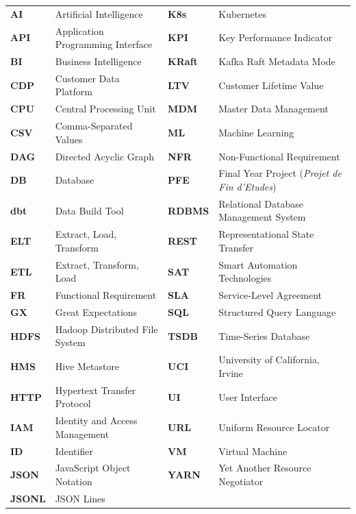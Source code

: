 \begingroup
{}
\normalsize
\singlespacing
\setlength{\tabcolsep}{3pt}
\renewcommand{\arraystretch}{1.04}
\noindent
\begin{tabularx}{\textwidth}{
    >{\bfseries\RaggedRight\arraybackslash}p{}
    >{\RaggedRight\arraybackslash}X
    !{\hspace{6pt}\color{ModernTableRule}\vrule width 0.6pt\hspace{6pt}}
    >{\bfseries\RaggedRight\arraybackslash}p{0.115\textwidth}
    >{\RaggedRight\arraybackslash}X
}
    AI & Artificial Intelligence & K8s & Kubernetes \\
    API & Application Programming Interface & KPI & Key Performance Indicator \\
    BI & Business Intelligence & KRaft & Kafka Raft Metadata Mode \\
    CDP & Customer Data Platform & LTV & Customer Lifetime Value \\
    CPU & Central Processing Unit & MDM & Master Data Management \\
    CSV & Comma-Separated Values & ML & Machine Learning \\
    DAG & Directed Acyclic Graph & NFR & Non-Functional Requirement \\
    DB & Database & PFE & Final Year Project (\textit{Projet de Fin d'Etudes}) \\
    dbt & Data Build Tool & RDBMS & Relational Database Management System \\
    ELT & Extract, Load, Transform & REST & Representational State Transfer \\
    ETL & Extract, Transform, Load & SAT & Smart Automation Technologies \\
    FR & Functional Requirement & SLA & Service-Level Agreement \\
    GX & Great Expectations & SQL & Structured Query Language \\
    HDFS & Hadoop Distributed File System & TSDB & Time-Series Database \\
    HMS & Hive Metastore & UCI & University of California, Irvine \\
    HTTP & Hypertext Transfer Protocol & UI & User Interface \\
    IAM & Identity and Access Management & URL & Uniform Resource Locator \\
    ID & Identifier & VM & Virtual Machine \\
    JSON & JavaScript Object Notation & YARN & Yet Another Resource Negotiator \\
    JSONL & JSON Lines & & \\
\end{tabularx}
\par
\clearpage
\endgroup